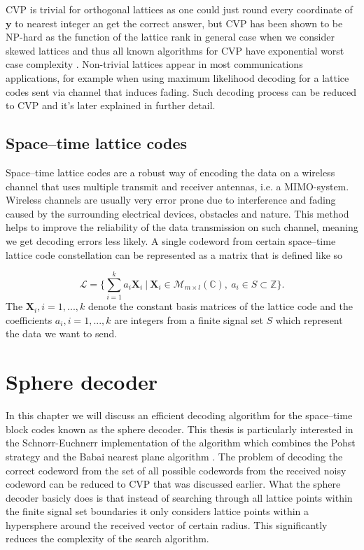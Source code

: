 \documentclass[english,12pt,a4paper,pdftex,sci,utf8]{aaltothesis}
\begin{document}
CVP is trivial for orthogonal lattices as one could just round every coordinate of $\mathbf{y}$ to nearest integer an get the correct answer, but CVP has been shown to be NP-hard as the function of the lattice rank in general case when we consider skewed lattices and thus all known algorithms for CVP have exponential worst case complexity \cite{agrell}. Non-trivial lattices appear in most communications applications, for example when using maximum likelihood decoding for a lattice codes sent via channel that induces fading. Such decoding process can be reduced to CVP and it's later explained in further detail.

\subsection{Space--time lattice codes}

Space--time lattice codes are a robust way of encoding the data on a  wireless channel that uses multiple transmit and receiver antennas, i.e. a MIMO-system. Wireless channels are usually very error prone due to interference and fading caused by the surrounding electrical devices, obstacles and nature. This method helps to improve the reliability of the data transmission on such channel, meaning we get decoding errors less likely. A single codeword from certain space--time lattice code constellation can be represented as a matrix that is defined like so

\begin{equation}
\mathcal{L} = \Bigg\{\sum_{i=1}^k a_i\mathbf{X}_i \ \Big| \ \mathbf{X}_i \in \mathcal{M}_{m \times l}(\mathbb{C}), \ a_i \in S \subset \mathbb{Z} \Bigg\}.
\label{eq:codeword}
\end{equation}
The $\mathbf{X}_i, i = 1,...,k$ denote the constant basis matrices of the lattice code and the coefficients $a_i, i = 1,...,k$ are integers from a finite signal set $S$ which represent the data we want to send.



\clearpage

\section{Sphere decoder}

In this chapter we will discuss an efficient decoding algorithm for the space--time block codes known as the sphere decoder. This thesis is particularly interested in the Schnorr-Euchnerr implementation of the algorithm which combines the Pohst strategy and the Babai nearest plane algorithm \cite{agrell}. The problem of decoding the correct codeword from the set of all possible codewords from the received noisy codeword can be reduced to CVP that was discussed earlier. What the sphere decoder basicly does is that instead of searching through all lattice points within the finite signal set boundaries it only considers lattice points within a hypersphere around the received vector of certain radius. This significantly reduces the complexity of the search algorithm. 
\end{document}
